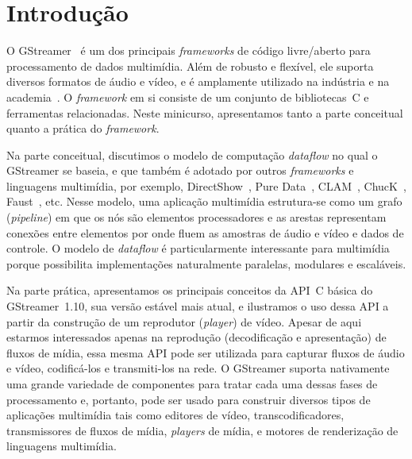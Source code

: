 \documentclass{SBCbookchapter}
\def\en#1{\foreignlanguage{english}{\emph{#1}}}
\begin{document}

\section{Introdução}
\label{sec:intro}

O GStreamer~\cite{gstreamer} é um dos principais \en{frameworks} de código
livre/aberto para processamento de dados multimídia.  Além de robusto e
flexível, ele suporta diversos formatos de áudio e vídeo, e é amplamente
utilizado na indústria e na academia~\cite{gstreamer-apps}.
O \en{framework} em si consiste de um conjunto de bibliotecas~C e
ferramentas relacionadas.  Neste minicurso, apresentamos tanto a parte
conceitual quanto a prática do \en{framework}.

Na parte conceitual, discutimos o modelo de computação \en{dataflow} no qual
o GStreamer se baseia, e que também é adotado por outros \en{frameworks} e
linguagens multimídia, por exemplo, DirectShow~\cite{Chatterjee-A-1997},
Pure Data~\cite{Puckette-M-S-2007}, CLAM~\cite{Amatriain-X-2008},
ChucK~\cite{Wang-G-2003}, Faust~\cite{Orlarey-Y-2009}, etc.  Nesse modelo,
uma aplicação multimídia estrutura-se como um grafo (\en{pipeline}) em que
os nós são elementos processadores e as arestas representam conexões entre
elementos por onde fluem as amostras de áudio e vídeo e dados de controle.
O modelo de \en{dataflow} é particularmente interessante para multimídia
porque possibilita implementações naturalmente paralelas, modulares e
escaláveis.

Na parte prática, apresentamos os principais conceitos da API~C básica do
GStreamer~1.10, sua versão estável mais atual, e ilustramos o uso dessa API
a partir da construção de um reprodutor (\en{player}) de vídeo.  Apesar de
aqui estarmos interessados apenas na reprodução (decodificação e
apresentação) de fluxos de mídia, essa mesma API pode ser utilizada para
capturar fluxos de áudio e vídeo, codificá-los e transmiti-los na rede.
O GStreamer suporta nativamente uma grande variedade de componentes para
tratar cada uma dessas fases de processamento e, portanto, pode ser usado
para construir diversos tipos de aplicações multimídia tais como editores de
vídeo, transcodificadores, transmissores de fluxos de mídia, \en{players} de
mídia, e motores de renderização de linguagens multimídia.
\end{document}
